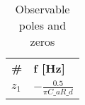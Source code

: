 \begin{table}[H]
\centering
\begin{tabular}[c]{ll}
\textbf{\#} & \textbf{f [Hz]} \\ 
\rowcolor{myyellow}
$z_{1}$ &\small{$- \frac{0.5}{\pi C\_{a} R\_{d}}$} \\ 
\end{tabular}
\caption{Observable poles and  zeros}
\end{table}

